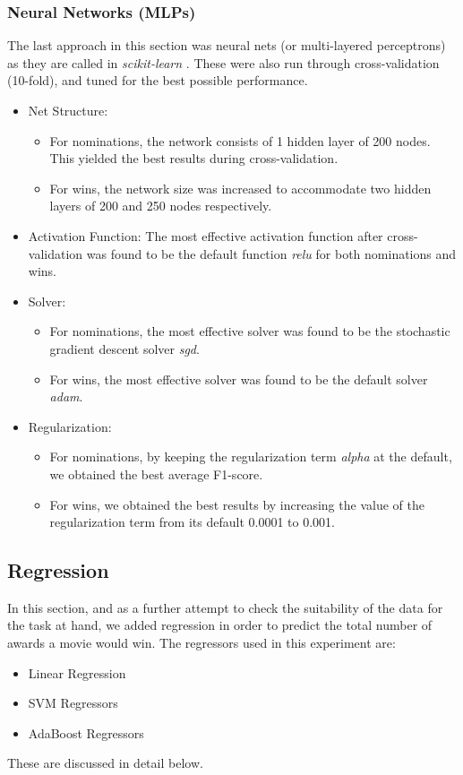 \documentclass[journal,transmag]{IEEEtran}
\begin{document}
			\subsubsection{Neural Networks (MLPs)}
			The last approach in this section was neural nets \cite{anns} (or multi-layered perceptrons) as they are called in \emph{scikit-learn} \cite{skl-anns}. These were also run through cross-validation (10-fold), and tuned for the best possible performance.
			\begin{itemize}
				\item Net Structure:
				\begin{itemize}
					\item For nominations, the network consists of 1 hidden layer of 200 nodes. This yielded the best results during cross-validation.
					\item For wins, the network size was increased to accommodate two hidden layers of 200 and 250 nodes respectively.
				\end{itemize}
				\item Activation Function:
					\newline
					The most effective activation function after cross-validation was found to be the default function \emph{relu} for both nominations and wins.
				\item Solver:
					\begin{itemize}
						\item For nominations, the most effective solver was found to be the stochastic gradient descent solver \emph{sgd}.
						\item For wins, the most effective solver was found to be the default solver \emph{adam}.
					\end{itemize}
				\item Regularization:
					\begin{itemize}
						\item For nominations, by keeping the regularization term \emph{alpha} at the default, we obtained the best average F1-score.
						\item For wins, we obtained the best results by increasing the value of the regularization term from its default 0.0001 to 0.001.
					\end{itemize}
			\end{itemize}
			
		\subsection{Regression}\label{subsec:regression}
			In this section, and as a further attempt to check the suitability of the data for the task at hand, we added regression in order to predict the total number of awards a movie would win. The regressors used in this experiment are:
			\begin{itemize}
				\item Linear Regression
				\item SVM Regressors
				\item AdaBoost Regressors
			\end{itemize}
			These are discussed in detail below.
			
\end{document}
